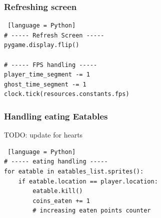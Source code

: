 \documentclass[11pt,a4paper]{report}
\begin{document}
				\subsubsection{Refreshing screen}
					\begin{lstlisting} [language = Python]
# ----- Refresh Screen -----
pygame.display.flip()

# ----- FPS handling -----
player_time_segment -= 1
ghost_time_segment -= 1
clock.tick(resources.constants.fps)
					\end{lstlisting}
				\subsubsection{Handling eating Eatables}
					TODO: update for hearts
					\begin{lstlisting} [language = Python]
# ----- eating handling -----
for eatable in eatables_list.sprites():
	if eatable.location == player.location:
		eatable.kill()
		coins_eaten += 1
		# increasing eaten points counter
					\end{lstlisting}
\end{document}
